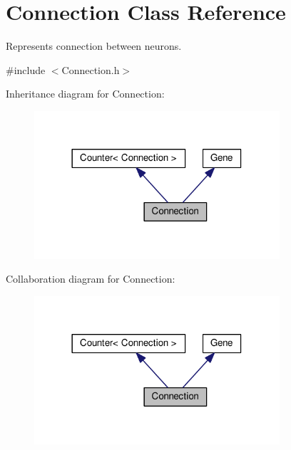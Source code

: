\hypertarget{classConnection}{}\section{Connection Class Reference}
\label{classConnection}


Represents connection between neurons.  




{\ttfamily \#include $<$Connection.\+h$>$}



Inheritance diagram for Connection\+:\nopagebreak
\begin{figure}[H]
\begin{center}
\leavevmode
\includegraphics[width=258pt]{classConnection__inherit__graph}
\end{center}
\end{figure}


Collaboration diagram for Connection\+:\nopagebreak
\begin{figure}[H]
\begin{center}
\leavevmode
\includegraphics[width=258pt]{classConnection__coll__graph}
\end{center}
\end{figure}
